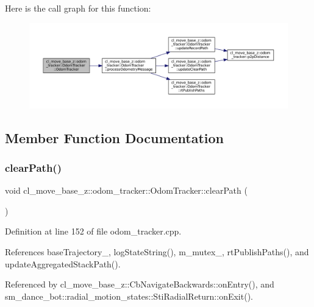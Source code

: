 Here is the call graph for this function\+:
\nopagebreak
\begin{figure}[H]
\begin{center}
\leavevmode
\includegraphics[width=350pt]{classcl__move__base__z_1_1odom__tracker_1_1OdomTracker_a99e1f405d0b3ec3e9fc73e666793c409_cgraph}
\end{center}
\end{figure}


\subsection{Member Function Documentation}
\mbox{\label{classcl__move__base__z_1_1odom__tracker_1_1OdomTracker_a93a14e15e3e623f530e056f403bf7644}} 
\subsubsection{\texorpdfstring{clear\+Path()}{clearPath()}}
{\footnotesize\ttfamily void cl\+\_\+move\+\_\+base\+\_\+z\+::odom\+\_\+tracker\+::\+Odom\+Tracker\+::clear\+Path (\begin{DoxyParamCaption}{ }\end{DoxyParamCaption})}



Definition at line 152 of file odom\+\_\+tracker.\+cpp.



References base\+Trajectory\+\_\+, log\+State\+String(), m\+\_\+mutex\+\_\+, rt\+Publish\+Paths(), and update\+Aggregated\+Stack\+Path().



Referenced by cl\+\_\+move\+\_\+base\+\_\+z\+::\+Cb\+Navigate\+Backwards\+::on\+Entry(), and sm\+\_\+dance\+\_\+bot\+::radial\+\_\+motion\+\_\+states\+::\+Sti\+Radial\+Return\+::on\+Exit().


